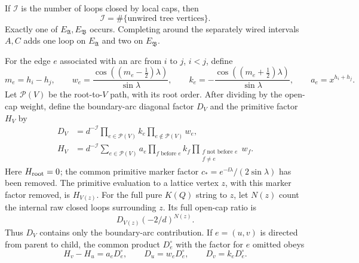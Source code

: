 \begin{lemma}
\label{lem:obs-tree}
If $\mathcal I$ is the number of loops closed by local caps, then
\begin{equation}
 \mathcal I=\#\{\text{unwired tree vertices}\}.
 \label{obs:loop-count}
\end{equation}
Exactly one of $E_{\mathfrak A},E_{\mathfrak B}$ occurs.  Completing
around the separately wired intervals $A,C$ adds one loop on
$E_{\mathfrak A}$ and two on $E_{\mathfrak B}$.

For the edge $e$ associated with an arc from $i$ to $j$, $i<j$, define
\begin{equation}
 m_e=h_i-h_j,\qquad
 w_e=\frac{\cos((m_e-\tfrac12)\lambda)}{\sin\lambda},\qquad
 k_e=-\frac{\cos((m_e+\tfrac12)\lambda)}{\sin\lambda},\qquad
 a_e=x^{h_i+h_j}.
 \label{obs:edge-weights}
\end{equation}
Let $\mathcal P(V)$ be the root-to-$V$ path, with its root order.
After dividing by the open-cap weight, define the boundary-arc
diagonal factor $D_V$ and the primitive factor $H_V$ by
\begin{align}
 D_V&=d^{-\mathcal I}
       \prod_{e\in\mathcal P(V)}k_e
       \prod_{e\notin\mathcal P(V)}w_e,\label{obs:D}\\
 H_V&=d^{-\mathcal I}\sum_{e\in\mathcal P(V)}a_e
       \prod_{f\text{ before }e}k_f
       \prod_{\substack{f\text{ not before }e\\f\ne e}}w_f.
       \label{obs:H}
\end{align}
Here $H_{\rm root}=0$; the common primitive marker factor
$c_*=e^{-\ii\lambda}/(2\sin\lambda)$ has been removed.  The primitive
evaluation to a lattice vertex $z$, with this marker factor removed,
is $H_{V(z)}$.  For the full pure $K(Q)$ string to $z$, let $N(z)$
count the internal raw closed loops surrounding $z$.  Its full
open-cap ratio is
\begin{equation}
 D_{V(z)}(-2/d)^{N(z)}.
 \label{obs:full-diagonal}
\end{equation}
Thus $D_V$ contains only the boundary-arc contribution.  If $e=(u,v)$
is directed from parent to child, the common product $D_e^\circ$ with
the factor for $e$ omitted obeys
\begin{equation}
 H_v-H_u=a_eD_e^\circ,\qquad
 D_u=w_eD_e^\circ,\qquad D_v=k_eD_e^\circ.
 \label{obs:recursion}
\end{equation}
\end{lemma}

